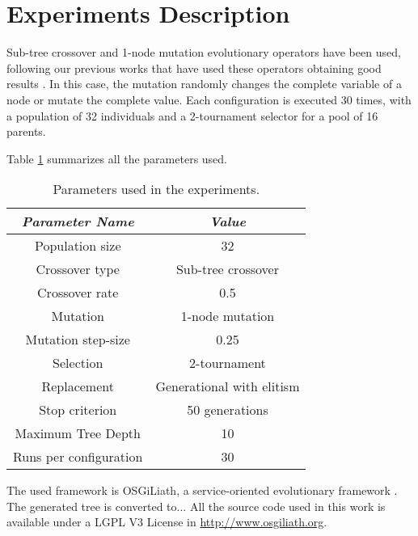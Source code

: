 \documentclass[runningheads,a4paper]{llncs}
\begin{document}
\section{Experiments Description}
\label{sec:experiments}

Sub-tree crossover and 1-node mutation evolutionary operators have been used, following our previous works that have used these operators obtaining good results \cite{CITAR_AQUI_EVOSTAR14GPBOT}. In this case, the mutation randomly changes the complete variable of a node or mutate the complete value. Each configuration is executed 30 times, with a population of 32 individuals and a 2-tournament selector for a pool of 16 parents.


Table \ref{tab:parameters} summarizes all the parameters used.

\begin{table}
\begin{center}
\begin{tabular}{|c|c|}
\hline
{\em Parameter Name} & {\em Value} \\\hline
Population size & 32 \\\hline
Crossover type & Sub-tree crossover \\ \hline
Crossover rate & 0.5\\ \hline
Mutation  & 1-node mutation\\ \hline
Mutation step-size & 0.25 \\ \hline
Selection & 2-tournament \\ \hline
Replacement & Generational with elitism\\ \hline
Stop criterion & 50 generations \\ \hline
Maximum Tree Depth & 10 \\ \hline %
Runs per configuration & 30 \\ \hline
\end{tabular}
\caption{Parameters used in the experiments.}
\label{tab:parameters}
\end{center}
\end{table}

The used framework is OSGiLiath, a service-oriented evolutionary framework \cite{Garcia13Service}. The generated tree is converted to...  All the source code used in this work is available under a LGPL V3 License in \url{http://www.osgiliath.org}.

\end{document}
